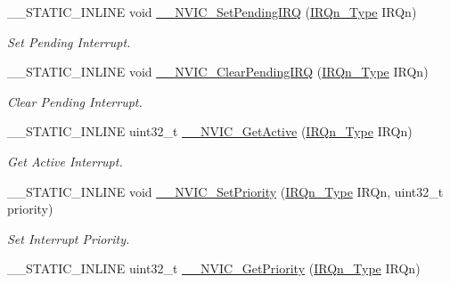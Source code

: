 \begin{DoxyCompactItemize}
\+\_\+\+\_\+\+S\+T\+A\+T\+I\+C\+\_\+\+I\+N\+L\+I\+NE void \mbox{\hyperlink{group___c_m_s_i_s___core___n_v_i_c_functions_gaabefdd4b790b9a7308929938c0c1e1ad}{\+\_\+\+\_\+\+N\+V\+I\+C\+\_\+\+Set\+Pending\+I\+RQ}} (\mbox{\hyperlink{group___configuration__section__for___c_m_s_i_s_ga7e1129cd8a196f4284d41db3e82ad5c8}{I\+R\+Qn\+\_\+\+Type}} I\+R\+Qn)
\begin{DoxyCompactList}\small\item\em Set Pending Interrupt. \end{DoxyCompactList}\item 
\+\_\+\+\_\+\+S\+T\+A\+T\+I\+C\+\_\+\+I\+N\+L\+I\+NE void \mbox{\hyperlink{group___c_m_s_i_s___core___n_v_i_c_functions_ga562a86dbdf14827d0fee8fdafb04d191}{\+\_\+\+\_\+\+N\+V\+I\+C\+\_\+\+Clear\+Pending\+I\+RQ}} (\mbox{\hyperlink{group___configuration__section__for___c_m_s_i_s_ga7e1129cd8a196f4284d41db3e82ad5c8}{I\+R\+Qn\+\_\+\+Type}} I\+R\+Qn)
\begin{DoxyCompactList}\small\item\em Clear Pending Interrupt. \end{DoxyCompactList}\item 
\+\_\+\+\_\+\+S\+T\+A\+T\+I\+C\+\_\+\+I\+N\+L\+I\+NE uint32\+\_\+t \mbox{\hyperlink{group___c_m_s_i_s___core___n_v_i_c_functions_gaa2837003c28c45abf193fe5e8d27f593}{\+\_\+\+\_\+\+N\+V\+I\+C\+\_\+\+Get\+Active}} (\mbox{\hyperlink{group___configuration__section__for___c_m_s_i_s_ga7e1129cd8a196f4284d41db3e82ad5c8}{I\+R\+Qn\+\_\+\+Type}} I\+R\+Qn)
\begin{DoxyCompactList}\small\item\em Get Active Interrupt. \end{DoxyCompactList}\item 
\+\_\+\+\_\+\+S\+T\+A\+T\+I\+C\+\_\+\+I\+N\+L\+I\+NE void \mbox{\hyperlink{group___c_m_s_i_s___core___n_v_i_c_functions_ga505338e23563a9c074910fb14e7d45fd}{\+\_\+\+\_\+\+N\+V\+I\+C\+\_\+\+Set\+Priority}} (\mbox{\hyperlink{group___configuration__section__for___c_m_s_i_s_ga7e1129cd8a196f4284d41db3e82ad5c8}{I\+R\+Qn\+\_\+\+Type}} I\+R\+Qn, uint32\+\_\+t priority)
\begin{DoxyCompactList}\small\item\em Set Interrupt Priority. \end{DoxyCompactList}\item 
\+\_\+\+\_\+\+S\+T\+A\+T\+I\+C\+\_\+\+I\+N\+L\+I\+NE uint32\+\_\+t \mbox{\hyperlink{group___c_m_s_i_s___core___n_v_i_c_functions_gaeb9dc99c8e7700668813144261b0bc73}{\+\_\+\+\_\+\+N\+V\+I\+C\+\_\+\+Get\+Priority}} (\mbox{\hyperlink{group___configuration__section__for___c_m_s_i_s_ga7e1129cd8a196f4284d41db3e82ad5c8}{I\+R\+Qn\+\_\+\+Type}} I\+R\+Qn)

\end{DoxyCompactItemize}
